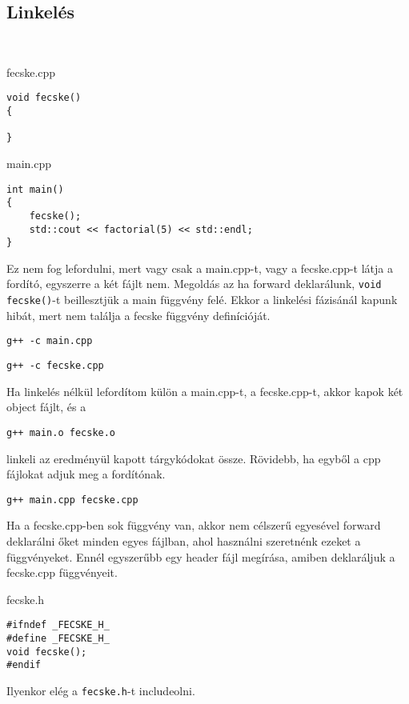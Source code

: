 \documentclass[a4paper,11.5pt]{article}
\begin{document}
	\subsection{Linkelés}
	\begin{example}\ 
		
		fecske.cpp
		\begin{lstlisting}
void fecske()
{

}
		\end{lstlisting}
		
		main.cpp
		\begin{lstlisting}
int main()
{
	fecske();
	std::cout << factorial(5) << std::endl;
}
		\end{lstlisting}
		
		Ez nem fog lefordulni, mert vagy csak a main.cpp-t, vagy a fecske.cpp-t látja a fordító, egyszerre a két fájlt nem. Megoldás az ha forward deklarálunk, \texttt{void fecske()}-t beillesztjük a main függvény felé. Ekkor a linkelési fázisánál kapunk hibát, mert nem találja a fecske függvény definícióját.
		
    \texttt{g++ -c main.cpp}

		\texttt{g++ -c fecske.cpp}

		Ha linkelés nélkül lefordítom külön a main.cpp-t, a fecske.cpp-t, akkor kapok két object fájlt, és a
		
		\texttt{g++ main.o fecske.o}
		
    linkeli az eredményül kapott tárgykódokat össze. Rövidebb, ha egyből a cpp fájlokat adjuk meg a fordítónak.

		\texttt{g++ main.cpp fecske.cpp}
	\end{example}
	Ha a fecske.cpp-ben sok függvény van, akkor nem célszerű egyesével forward deklarálni őket minden egyes fájlban, ahol használni szeretnénk ezeket a függvényeket. Ennél egyszerűbb egy header fájl megírása, amiben deklaráljuk a fecske.cpp függvényeit.
	
	fecske.h
	\begin{lstlisting}
#ifndef _FECSKE_H_
#define _FECSKE_H_
void fecske();
#endif
	\end{lstlisting}
	Ilyenkor elég a \texttt{fecske.h}-t includeolni.
	
\end{document}
